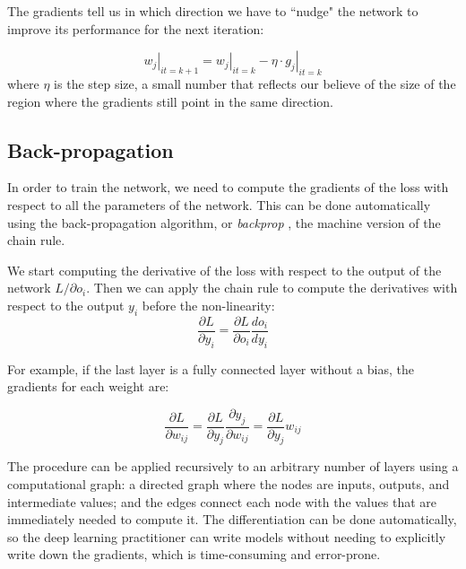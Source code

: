 The gradients tell us in which direction we have to ``nudge" the network to improve its performance for the next iteration:

\begin{equation*}
\left. w_j\right|_{it=k+1} = \left. w_j\right|_{it=k} - \eta \cdot \left. g_j\right|_{it=k}
\end{equation*}
where $\eta$ is the step size, a small number that reflects our believe of the size of the region where the gradients still point in the same direction.

\subsection{Back-propagation}
In order to train the network, we need to compute the gradients of the loss with respect to all the parameters of the network.
This can be done automatically using the back-propagation algorithm, or \emph{backprop} \citep{backprop}, the machine version of the chain rule.

We start computing the derivative of the loss with respect to the output of the network ${L}/{\partial o_i}$.
Then we can apply the chain rule to compute the derivatives with respect to the output $y_i$ before the non-linearity:
\begin{equation*}
\frac{\partial L}{\partial y_i} = \frac{\partial L}{\partial o_i} \frac{d o_i}{d y_i}
\end{equation*}

For example, if the last layer is a fully connected layer without a bias, the gradients for each weight are:

\begin{equation*}
\frac{\partial L}{\partial w_{ij}} = \frac{\partial L}{\partial y_j} \frac{\partial y_j}{\partial w_{ij}} =  \frac{\partial L}{\partial y_j}  w_{ij}
\end{equation*}

The procedure  can be applied recursively to an arbitrary number of layers using a computational graph: a directed graph where the nodes are inputs, outputs, and intermediate values; and the edges connect each node with the values that are immediately needed to compute it.
The differentiation can be done automatically, so the deep learning practitioner can write models without needing to explicitly write down the gradients, which is time-consuming and error-prone.


